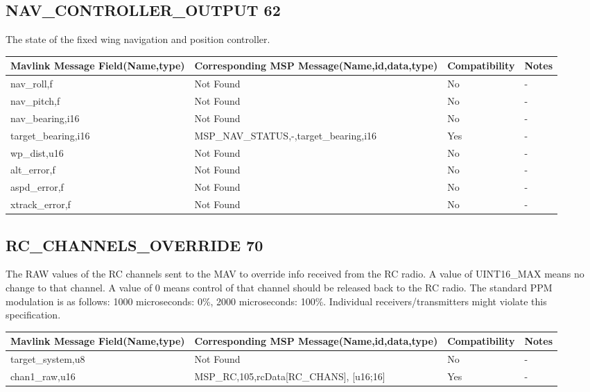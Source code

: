 \subsection{NAV\_CONTROLLER\_OUTPUT 62}
The state of the fixed wing navigation and position controller. \\
{
\centering
\begin{tabular}{ |p{4cm  } |p{7cm} | p{2cm}|m{5em}|}
\hline
Mavlink Message Field(Name,type)&Corresponding MSP Message(Name,id,data,type)& Compatibility & Notes\\
\hline
nav\_roll,f & Not Found & No & - \\
\hline
nav\_pitch,f & Not Found & No & - \\
\hline
nav\_bearing,i16 & Not Found & No & - \\
\hline
\rowcolor{green}
target\_bearing,i16 & MSP\_NAV\_STATUS,-,target\_bearing,i16 & Yes & - \\
\hline
wp\_dist,u16 & Not Found & No & - \\
\hline
alt\_error,f & Not Found & No & - \\
\hline
aspd\_error,f & Not Found & No & - \\
\hline
xtrack\_error,f & Not Found & No & - \\
\end{tabular}
}
\cleardoublepage



\subsection{RC\_CHANNELS\_OVERRIDE 70} 
The RAW values of the RC channels sent to the MAV to override info received from the RC radio. A value of UINT16\_MAX means no change to that channel. A value of 0 means control of that channel should be released back to the RC radio. The standard PPM modulation is as follows: 1000 microseconds: 0\%, 2000 microseconds: 100\%. Individual receivers/transmitters might violate this specification.\\

{
\centering
\begin{tabular}{ |p{4cm  } |p{7cm} | p{2cm}|m{5em}|}
\hline
Mavlink Message Field(Name,type)&Corresponding MSP Message(Name,id,data,type)& Compatibility & Notes\\
\hline
target\_system,u8 & Not Found & No & - \\
\hline
\rowcolor{green}
chan1\_raw,u16 & MSP\_RC,105,rcData[RC\_CHANS], [u16;16]& Yes & - \\
\end{tabular}
}


